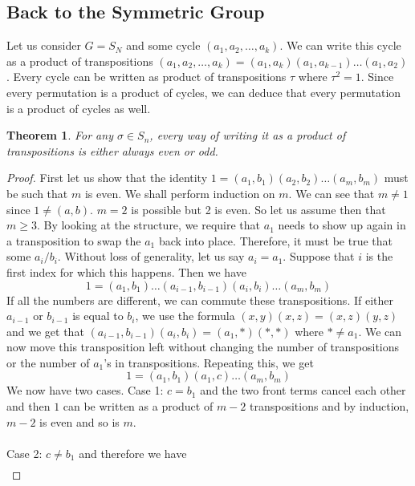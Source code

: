 \documentclass{article}
\newtheorem{theorem}{Theorem}[section]
\theoremstyle{definition}
\begin{document}
\subsection{Back to the Symmetric Group}
Let us consider $G=S_N$ and some cycle $(a_1,a_2,\ldots, a_k)$. We can write this cycle as a product of transpositions $(a_1,a_2,\ldots, a_k)=(a_1,a_k)(a_1,a_{k-1})\ldots (a_1,a_2)$. Every cycle can be written as product of transpositions $\tau$ where $\tau^2=1$. Since every permutation is a product of cycles, we can deduce that every permutation is a product of cycles as well. 
\begin{theorem}
    For any $\sigma \in S_n$, every way of writing it as a product of transpositions is either always even or odd.
\end{theorem}
\begin{proof}
    First let us show that the identity $1=(a_1,b_1)(a_2,b_2)\ldots (a_m,b_m)$ must be such that $m$ is even. We shall perform induction on $m$. We can see that $m\neq 1$ since $1\neq (a,b)$. $m=2$ is possible but 2 is even. So let us assume then that $m\geq 3$. By looking at the structure, we require that $a_1$ needs to show up again in a transposition to swap the $a_1$ back into place. Therefore, it must be true that some $a_i/b_i$. Without loss of generality, let us say $a_i=a_1$. Suppose that $i$ is the first index for which this happens. Then we have 
    \begin{equation*}
        1=(a_1,b_1)\ldots(a_{i-1},b_{i-1})(a_i,b_i)\ldots (a_m,b_m)
    \end{equation*}
    If all the numbers are different, we can commute these transpositions. If either $a_{i-1}$ or $b_{i-1}$ is equal to $b_i$, we use the formula $(x,y)(x,z)=(x,z)(y,z)$ and we get that $(a_{i-1},b_{i-1})(a_i,b_i)=(a_1,*)(*,*)$ where $*\neq a_1$. We can now move this transposition left without changing the number of transpositions or the number of $a_1$'s in transpositions. Repeating this, we get 
    \begin{equation*}
        1=(a_1,b_1)(a_1,c)\ldots (a_m,b_m)
    \end{equation*}
    We now have two cases. Case 1: $c=b_1$ and the two front terms cancel each other and then $1$ can be written as a product of $m-2$ transpositions and by induction, $m-2$ is even and so is $m$.\\\\ 
    Case 2: $c\neq b_1$ and therefore we have 
    \begin{equation*}
        \begin{split}

\end{split}
\end{equation*}
\end{proof}
\end{document}
